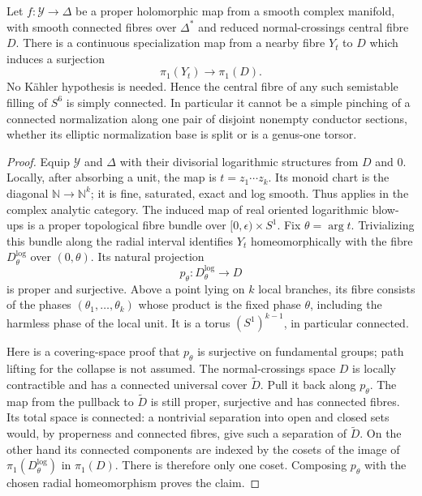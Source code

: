 \begin{theorem}\label{push:src:B.4.2}\label{push:B42}
Let $f:\mathcal Y\to\Delta$ be a
proper holomorphic map from a smooth
complex manifold, with smooth connected
fibres over $\Delta^*$ and reduced
normal-crossings central fibre $D$.
There is a continuous specialization
map from a nearby fibre $Y_t$ to $D$
which induces a surjection
\[
 \pi_1(Y_t)\longrightarrow\pi_1(D).
\]
No K\"ahler hypothesis is needed.
Hence the central fibre of any such
semistable filling of $S^6$ is simply
connected. In particular it cannot
be a simple pinching of a connected
normalization along one pair of
disjoint nonempty conductor sections,
whether its elliptic normalization
base is split or is a genus-one torsor.
\end{theorem}
\begin{proof}
Equip $\mathcal Y$ and $\Delta$ with
their divisorial logarithmic structures
from $D$ and $0$. Locally, after
absorbing a unit, the map is
$t=z_1\cdots z_k$. Its monoid chart
is the diagonal
$\mathbb N\to\mathbb N^k$; it is
fine, saturated, exact and log smooth.
Thus \cite[Theorem 5.1, p.2226]{NO10}
applies in the complex analytic
category. The induced map of real
oriented logarithmic blow-ups is a
proper topological fibre bundle over
$[0,\epsilon)\times S^1$.
Fix $\theta=\arg t$. Trivializing
this bundle along the radial interval
identifies $Y_t$ homeomorphically with
the fibre $D^{\log}_\theta$ over
$(0,\theta)$. Its natural projection
\[
 p_\theta:D^{\log}_\theta\longrightarrow D
\]
is proper and surjective. Above a
point lying on $k$ local branches,
its fibre consists of the phases
$(\theta_1,\ldots,\theta_k)$ whose
product is the fixed phase $\theta$,
including the harmless phase of the
local unit. It is a torus
$(S^1)^{k-1}$, in particular connected.

Here is a covering-space proof that
$p_\theta$ is surjective on fundamental
groups; path lifting for the collapse
is not assumed. The normal-crossings
space $D$ is locally contractible
and has a connected universal cover
$\widetilde D$. Pull it back along
$p_\theta$. The map from the pullback
to $\widetilde D$ is still proper,
surjective and has connected fibres.
Its total space is connected: a
nontrivial separation into open and
closed sets would, by properness and
connected fibres, give such a
separation of $\widetilde D$.
On the other hand its connected
components are indexed by the cosets
of the image of
$\pi_1(D^{\log}_\theta)$ in $\pi_1(D)$.
There is therefore only one coset.
Composing $p_\theta$ with the chosen
radial homeomorphism proves the claim.


\end{proof}

